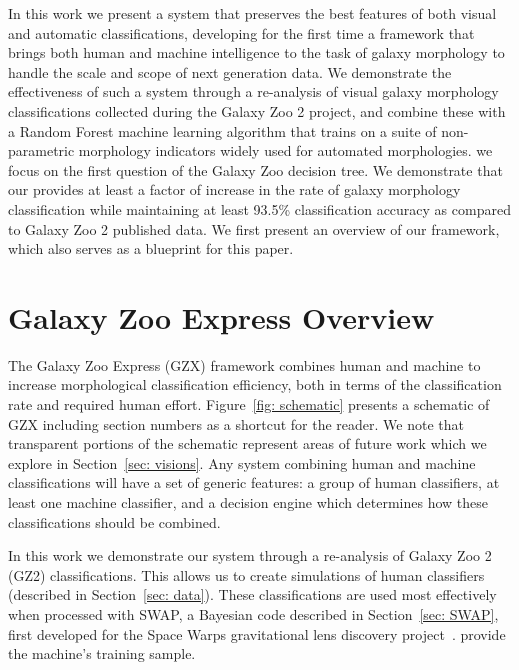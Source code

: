 \documentclass[twocolumn,  trackchanges, ]{aastex6}%
\begin{document}
 In this work we present a system that preserves the best features of both visual and automatic classifications, developing for the first time a framework that brings both human and machine intelligence to the task of galaxy morphology to handle the scale and scope of next generation data. We demonstrate the effectiveness of such a system through a re-analysis of visual galaxy morphology classifications collected during the Galaxy Zoo 2 project, and combine these with a Random Forest machine learning algorithm that trains on a suite of non-parametric morphology indicators widely used for automated morphologies. 
 we focus on the first question of the Galaxy Zoo decision tree. We demonstrate that our  provides at least a factor of  increase in the rate of galaxy morphology classification while maintaining at least 93.5\% classification accuracy as compared to Galaxy Zoo 2 published data. We first present an overview of our framework, which also serves as a blueprint for this paper. 


\section{Galaxy Zoo Express Overview}

The Galaxy Zoo Express (GZX) framework combines human and machine to  increase morphological classification efficiency, both in terms of the classification rate and required human effort. Figure~\ref{fig: schematic} presents a schematic of GZX including section numbers as a shortcut for the reader. We note that transparent portions of the schematic represent areas of future work which we explore in Section~\ref{sec: visions}. Any system combining human and machine classifications will have a set of generic features: a group of human classifiers, at least one machine classifier, and a decision engine which determines how these classifications should be combined.

In this work we demonstrate our system through a re-analysis of  Galaxy Zoo 2 (GZ2) classifications. This allows us to  create simulations of human classifiers (described in Section~\ref{sec: data}). These classifications are used most effectively when processed with SWAP, a Bayesian code described in Section~\ref{sec: SWAP}, first developed for the Space Warps gravitational lens discovery project~\citep{Marshall2016}.  provide the machine's training sample. 
\end{document}
